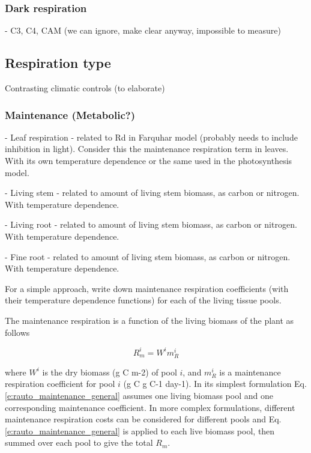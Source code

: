 \documentclass[twoside,10pt]{report}
\begin{document}
\subsubsection{Dark respiration}
- C3, C4, CAM (we can ignore, make clear anyway, impossible to measure)

\subsection{Respiration type}

Contrasting climatic controls (to elaborate)

\subsubsection{Maintenance (Metabolic?)}

- Leaf respiration - related to Rd in Farquhar model (probably needs to include inhibition in light). Consider this the maintenance respiration term in leaves. With its own temperature dependence or the same used in the photosynthesis model. 

- Living stem - related to amount of living stem biomass, as carbon or nitrogen. With temperature dependence. 

- Living root - related to amount of living stem biomass, as carbon or nitrogen. With temperature dependence. 

- Fine root - related to amount of living stem biomass, as carbon or nitrogen. With temperature dependence. 

For a simple approach, write down maintenance respiration coefficients (with their temperature dependence functions) for each of the living tissue pools. 

The maintenance respiration is a function of the living biomass of the plant as follows

\begin{equation}
\label{e:rauto_maintenance_general}
    R_m^i = W^i m_R^i
\end{equation}

where $W^i$ is the dry biomass (g C m-2) of pool $i$, and $m_R^i$ is a maintenance respiration coefficient for pool $i$ (g C g C-1 day-1). In its simplest formulation Eq. \ref{e:rauto_maintenance_general} assumes one living biomass pool and one corresponding maintenance coefficient. In more complex formulations, different maintenance respiration costs can be considered for different pools and Eq. \ref{e:rauto_maintenance_general} is applied to each live biomass pool, then summed over each pool to give the total $R_m$. 
\end{document}
